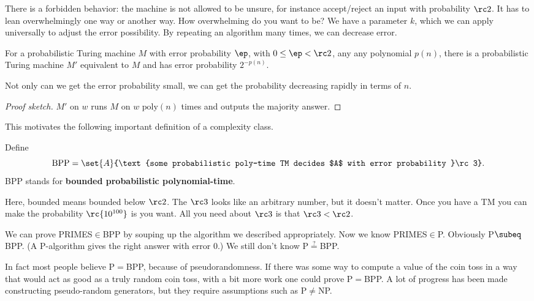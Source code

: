 There is a forbidden behavior: the machine is not allowed to be unsure, for instance accept/reject an input with probability $\rc2$. It has to lean overwhelmingly one way or another way. How overwhelming do you want to be? We have a parameter $k$, which we can apply universally to adjust the error possibility. By repeating an algorithm many times, we can decrease error. %
\begin{lem}
For a probabilistic Turing machine $M$ with error probability $\ep$, with $0\le \ep<\rc2$, any any polynomial $p(n)$, 
there is a probabilistic Turing machine $M'$ %
equivalent to $M$ and has error probability $2^{-p(n)}$.
\end{lem}
Not only can we get the error probability small, we can get the probability decreasing rapidly in terms of $n$.
\begin{proof}[Proof sketch]
$M'$ on $w$ runs $M$ on $w$ $\text{poly}(n)$ times and outputs the majority answer.  %
\end{proof}
This motivates the following important definition of a complexity class.
\begin{df}
Define
\[
\text{BPP}=\set{A}{\text{some probabilistic poly-time TM decides $A$ with error probability }\rc3}.
\]
BPP stands for \textbf{bounded probabilistic polynomial-time}.
\end{df}
Here, bounded means bounded below $\rc2$. 
The $\rc3$ looks like an arbitrary number, but it doesn't matter. Once you have a TM you can make the probability $\rc{10^{100}}$ is you want. All you need about $\rc3$ is that $\rc3<\rc2$.


We can prove PRIMES$\in$BPP by souping up the algorithm we described appropriately. Now we know PRIMES$\in$P. Obviously P$\subeq$BPP. (A P-algorithm gives the right answer with error 0.) We still don't know P$\stackrel ?=$BPP. 

In fact most people believe P$=$BPP, because of pseudorandomness. If there was some way to compute a value of the coin toss in a way that would act as good as a truly random coin toss, with a bit more work one could prove P$=$BPP. A lot of progress has been made constructing pseudo-random generators, but they require assumptions such as P$\ne$NP.

